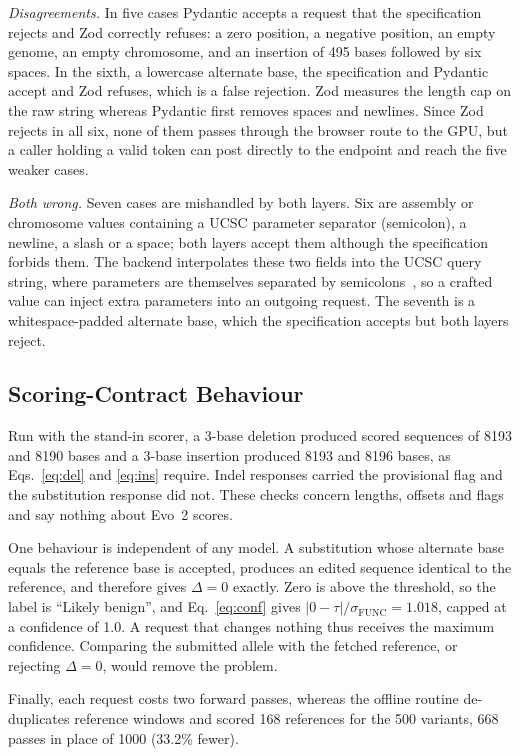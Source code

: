 \documentclass[10pt,journal,a4paper]{IEEEtran}
\begin{document}
\textit{Disagreements.} In five cases Pydantic accepts a request that the specification rejects and Zod correctly refuses: a zero position, a negative position, an empty genome, an empty chromosome, and an insertion of 495 bases followed by six spaces. In the sixth, a lowercase alternate base, the specification and Pydantic accept and Zod refuses, which is a false rejection. Zod measures the length cap on the raw string whereas Pydantic first removes spaces and newlines. Since Zod rejects in all six, none of them passes through the browser route to the GPU, but a caller holding a valid token can post directly to the endpoint and reach the five weaker cases.

\textit{Both wrong.} Seven cases are mishandled by both layers. Six are assembly or chromosome values containing a UCSC parameter separator (semicolon), a newline, a slash or a space; both layers accept them although the specification forbids them. The backend interpolates these two fields into the UCSC query string, where parameters are themselves separated by semicolons~\cite{lee2020ucscapi}, so a crafted value can inject extra parameters into an outgoing request. The seventh is a whitespace-padded alternate base, which the specification accepts but both layers reject.

\subsection{Scoring-Contract Behaviour}
\label{sec:res-contract}
Run with the stand-in scorer, a 3-base deletion produced scored sequences of 8193 and 8190 bases and a 3-base insertion produced 8193 and 8196 bases, as Eqs.~\eqref{eq:del} and \eqref{eq:ins} require. Indel responses carried the provisional flag and the substitution response did not. These checks concern lengths, offsets and flags and say nothing about Evo~2 scores.

One behaviour is independent of any model. A substitution whose alternate base equals the reference base is accepted, produces an edited sequence identical to the reference, and therefore gives $\Delta=0$ exactly. Zero is above the threshold, so the label is ``Likely benign'', and Eq.~\eqref{eq:conf} gives $|0-\tau|/\sigma_{\mathrm{FUNC}}=1.018$, capped at a confidence of 1.0. A request that changes nothing thus receives the maximum confidence. Comparing the submitted allele with the fetched reference, or rejecting $\Delta=0$, would remove the problem.

Finally, each request costs two forward passes, whereas the offline routine de-duplicates reference windows and scored 168 references for the 500 variants, 668 passes in place of 1000 (33.2\% fewer).
\end{document}

